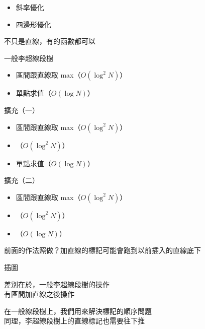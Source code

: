 \begin{frame}{}
    \begin{itemize}
        \item 斜率優化 
        \item<2> 四邊形優化 
    \end{itemize}

     {
        不只是直線，有的函數都可以
    }
\end{frame}

\begin{frame}{}
    一般李超線段樹

    \begin{itemize}
        \item 區間跟直線取 max（$O(\log^2 N)$）
        \item 單點求值（$O(\log N)$）
    \end{itemize}
\end{frame}

\begin{frame}{}
    擴充（一）

    \begin{itemize}
        \item 區間跟直線取 max（$O(\log^2 N)$）
        \item {}（$O(\log^2 N)$）
        \item 單點求值（$O(\log N)$）
    \end{itemize}

    擴充（二）

    \begin{itemize}
        \item 區間跟直線取 max（$O(\log^2 N)$）
        \item {}（$O(\log^2 N)$）
        \item {}（$O(\log N)$）
    \end{itemize}
\end{frame}

\begin{frame}{}
    前面的作法照做？加直線的標記可能會跑到以前插入的直線底下

    \todo 插圖
\end{frame}

\begin{frame}{}
    差別在於，一般李超線段樹的操作\\
    有區間加直線之後操作

     {
        在一般線段樹上，我們用來解決標記的順序問題\\
        同理，李超線段樹上的直線標記也需要往下推
    }
\end{frame}

